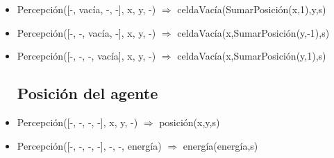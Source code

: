 \begin{itemize}
\item Percepción([-, vacía, -, -], x, y, -) $\Rightarrow$
\newline celdaVacía(SumarPosición(x,1),y,s)

\item Percepción([-, -, vacía, -], x, y, -) $\Rightarrow$
\newline celdaVacía(x,SumarPosición(y,-1),s)

\item Percepción([-, -, -, vacía], x, y, -) $\Rightarrow$
\newline celdaVacía(x,SumarPosición(y,1),s)

\subsection{Posición del agente}
\item Percepción([-, -, -, -], x, y, -) $\Rightarrow$ posición(x,y,s)

\item Percepción([-, -, -, -], -, -, energía) $\Rightarrow$ energía(energía,s)

\end{itemize}

